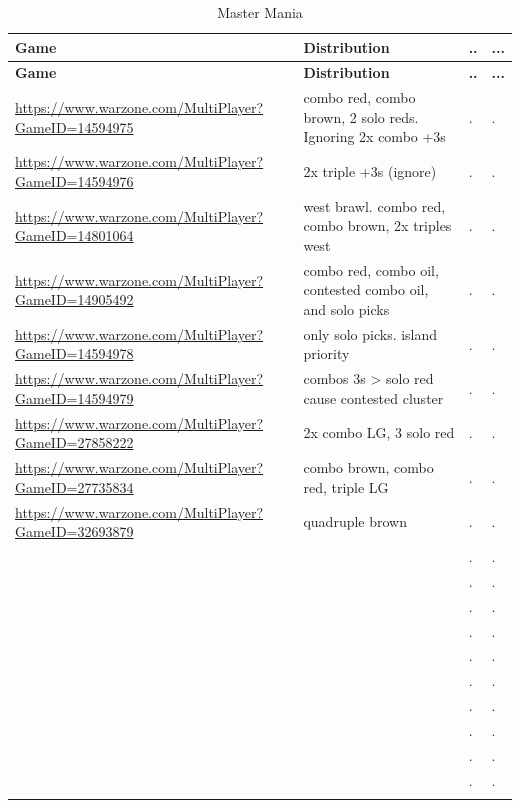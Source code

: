 \small
\begin{longtable}{|p{4.5cm}|p{6.5cm}||p{0.5cm}|p{0.5cm}|}
\hline
\rowcolor{black!20}
\textbf{Game} & \textbf{Distribution} & \textbf{..} & \textbf{...} \\ \hline
\endfirsthead

\hline
\rowcolor{black!20}
\textbf{Game} & \textbf{Distribution} & \textbf{..} & \textbf{...} \\ \hline
\endhead

\url{https://www.warzone.com/MultiPlayer?GameID=14594975} & combo red, combo brown, 2 solo reds. Ignoring 2x combo +3s  & . & . \\ \hline
\url{https://www.warzone.com/MultiPlayer?GameID=14594976} & 2x triple +3s (ignore) & . & . \\ \hline
\url{https://www.warzone.com/MultiPlayer?GameID=14801064} & west brawl. combo red, combo brown, 2x triples west & . & . \\ \hline
\url{https://www.warzone.com/MultiPlayer?GameID=14905492} & combo red, combo oil, contested combo oil, and solo picks & . & . \\ \hline
\url{https://www.warzone.com/MultiPlayer?GameID=14594978} & only solo picks. island priority & . & . \\ \hline
\url{https://www.warzone.com/MultiPlayer?GameID=14594979} & combos 3s > solo red cause contested cluster & . & . \\ \hline
\url{https://www.warzone.com/MultiPlayer?GameID=27858222} & 2x combo LG, 3 solo red & . & . \\ \hline
\url{https://www.warzone.com/MultiPlayer?GameID=27735834} & combo brown, combo red, triple LG  & . & . \\ \hline
\url{https://www.warzone.com/MultiPlayer?GameID=32693879} & quadruple brown & . & . \\ \hline
\url{} & & . & . \\ \hline
\url{} & & . & . \\ \hline
\url{} & & . & . \\ \hline
\url{} & & . & . \\ \hline
\url{} & & . & . \\ \hline
\url{} & & . & . \\ \hline
\url{} & & . & . \\ \hline
\url{} & & . & . \\ \hline
\url{} & & . & . \\ \hline
\url{} & & . & . \\ \hline


\caption{Master Mania}
\label{Master Mania}
\end{longtable}

\normalsize
